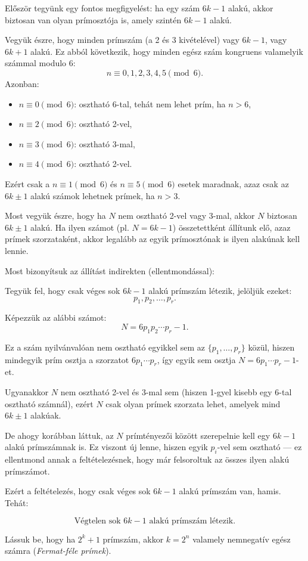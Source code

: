 \begin{solution}
Először tegyünk egy fontos megfigyelést: ha egy szám $6k-1$ alakú,
akkor biztosan van olyan prímosztója is, amely szintén $6k-1$ alakú.

Vegyük észre, hogy minden prímszám (a 2 és 3 kivételével) vagy $6k-1$,
vagy $6k+1$ alakú. Ez abból következik, hogy minden egész szám kongruens
valamelyik számmal modulo 6: 
\[
n\equiv0,1,2,3,4,5\pmod 6.
\]
Azonban: 
\begin{itemize}
\item $n\equiv0\pmod 6$: osztható 6-tal, tehát nem lehet prím, ha $n>6$, 
\item $n\equiv2\pmod 6$: osztható 2-vel, 
\item $n\equiv3\pmod 6$: osztható 3-mal, 
\item $n\equiv4\pmod 6$: osztható 2-vel. 
\end{itemize}
Ezért csak a $n\equiv1\pmod 6$ és $n\equiv5\pmod 6$ esetek maradnak,
azaz csak az $6k\pm1$ alakú számok lehetnek prímek, ha $n>3$.

Most vegyük észre, hogy ha $N$ nem osztható 2-vel vagy 3-mal, akkor
$N$ biztosan $6k\pm1$ alakú. Ha ilyen számot (pl. $N=6k-1$) összetettként
állítunk elő, azaz prímek szorzataként, akkor legalább az egyik prímosztónak
is ilyen alakúnak kell lennie.

\medskip{}

Most bizonyítsuk az állítást indirekten (ellentmondással):

Tegyük fel, hogy csak véges sok $6k-1$ alakú prímszám létezik, jelöljük
ezeket: 
\[
p_{1},p_{2},\dots,p_{r}.
\]

Képezzük az alábbi számot: 
\[
N=6p_{1}p_{2}\cdots p_{r}-1.
\]

Ez a szám nyilvánvalóan nem osztható egyikkel sem az $\{p_{1},\dots,p_{r}\}$
közül, hiszen mindegyik prím osztja a szorzatot $6p_{1}\cdots p_{r}$,
így egyik sem osztja $N=6p_{1}\cdots p_{r}-1$-et.

Ugyanakkor $N$ nem osztható 2-vel és 3-mal sem (hiszen 1-gyel kisebb
egy 6-tal osztható számnál), ezért $N$ csak olyan prímek szorzata
lehet, amelyek mind $6k\pm1$ alakúak.

De ahogy korábban láttuk, az $N$ prímtényezői között szerepelnie
kell egy $6k-1$ alakú prímszámnak is. Ez viszont új lenne, hiszen
egyik $p_{i}$-vel sem osztható --- ez ellentmond annak a feltételezésnek,
hogy már felsoroltuk az összes ilyen alakú prímszámot.

\medskip{}

Ezért a feltételezés, hogy csak véges sok $6k-1$ alakú prímszám van,
hamis. Tehát:

\[
\text{Végtelen sok }6k-1\text{ alakú prímszám létezik.}
\]
\end{solution}
\begin{problem}
Lássuk be, hogy ha $2^{k}+1$ prímszám, akkor $k=2^{n}$ valamely
nemnegatív egész számra (\textit{Fermat-féle prímek}).
\end{problem}

